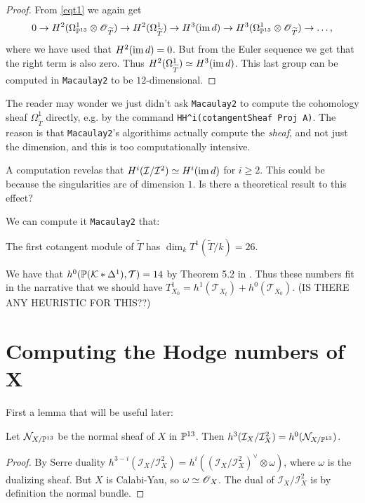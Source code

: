 \documentclass[11pt, english]{article}
\begin{document}
\begin{proof}
From \eqref{eqt1} we again get 
\[
0 \to H^2(\Omega_{\mathbb{P}^{13}}^1 \otimes \operatorname{\mathscr{O}}_{\widetilde T}) \to H^2(\Omega_{\widetilde T}^1) \to H^3(\operatorname{im} d) \to H^3(\Omega_{\mathbb{P}^{13}}^1 \otimes \operatorname{\mathscr{O}}_{\widetilde T}) \to \ldots ,
\]
where we have used that $H^2(\operatorname{im} d)=0$. But from the Euler sequence we get that the right term is also zero. Thus $H^2(\Omega_{\widetilde T}^1) \simeq H^3(\operatorname{im} d)$. This last group can be computed in \verb|Macaulay2| to be $12$-dimensional. 
\end{proof}

\begin{remark}
 The reader may wonder we just didn't ask \verb|Macaulay2| to compute the cohomology sheaf $\Omega_{\widetilde T}^1$ directly, e.g. by the command \verb|HH^i(cotangentSheaf Proj A)|. The reason is that \verb|Macaulay2|'s algorithims actually compute the \emph{sheaf}, and not just the dimension, and this is too computationally intensive.
\end{remark}

\begin{remark}[Question]
A computation revelas that $H^i(\mathcal I/\mathcal I^2) \simeq H^i(\operatorname{im} d)$ for $ i\geq 2$. This could be because the singularities are of dimension $1$. Is there a theoretical result to this effect?
\end{remark}

We can compute it \verb|Macaulay2| that:
\begin{lemma}
The first cotangent module of $\widetilde T$ has $\dim_k T^1(\widetilde T/k) = 26$. 
\end{lemma}

We have that $h^0(\mathbb{P}(\mathcal K \ast \Delta^1),\mathcal T)=14$ by Theorem 5.2 in \cite{deforming_christophersen}. Thus these numbers fit in the narrative that we should have $T^1_{X_0} = h^1(\mathcal T_{X_t}) + h^0(\mathcal T_{X_0})$. (IS THERE ANY HEURISTIC FOR THIS??)

\section{Computing the Hodge numbers of X}

First a lemma that will be useful later:
\begin{lemma}
\label{lemmanormal}
Let $\mathcal N_{X/\mathbb{P}^{13}}$ be the normal sheaf of $X$ in $\mathbb{P}^{13}$. Then $h^3(\mathcal I_X/\mathcal I_X^2) = h^0(\mathcal N_{X/\mathbb{P}^{13}})$.
\end{lemma}
\begin{proof}
By Serre duality $h^{3-i}(\mathcal I_X/\mathcal I_X^2)=h^{i}((\mathcal I_X/\mathcal I_X^2)^\vee \otimes \omega)$, where $\omega$ is the dualizing sheaf. But $X$ is Calabi-Yau, so $\omega \simeq \operatorname{\mathscr{O}}_X$. The dual of $\mathcal I_X/\mathcal I_X^2$ is by definition the normal bundle.
\end{proof}
\end{document}
